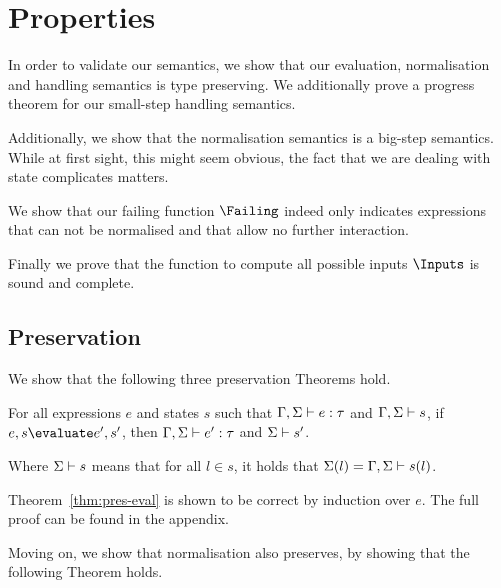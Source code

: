 


\section{Properties}




In order to validate our semantics, we show that our evaluation, normalisation
and handling semantics is type preserving. We additionally prove a progress
theorem for our small-step handling semantics.

Additionally, we show that the normalisation semantics is a big-step semantics.
While at first sight, this might seem obvious, the fact that we are dealing with
state complicates matters.

We show that our failing function $\Failing$ indeed only indicates expressions
that can not be normalised and that allow no further interaction.

Finally we prove that the function to compute all possible inputs $\Inputs$ is sound and complete.



\subsection{Preservation}
\label{sub:preservation}

We show that the following three preservation Theorems hold.

\begin{theorem}
  For all expressions $e$ and states $s$
  such that $\Gamma,\Sigma \vdash e:\tau$ and $\Gamma,\Sigma \vdash s$,
  if $e,s \evaluate e',s'$,
  then $\Gamma,\Sigma \vdash e':\tau$ and $\Sigma \vdash s'$.
  \label{thm:pres-eval}
\end{theorem}

Where $\Sigma \vdash s$ means that for all $l\in s$, it holds that
$\Sigma(l)=\Gamma,\Sigma\vdash s(l)$.

Theorem~\ref{thm:pres-eval} is shown to be correct by induction over $e$. The full
proof can be found in the appendix.


Moving on, we show that normalisation also preserves, by showing that the
following Theorem holds.

